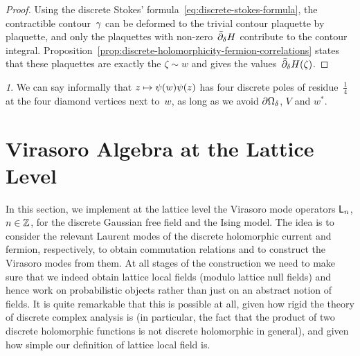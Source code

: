 \documentclass[12pt,oneside,english]{amsart}
\numberwithin{equation}{section}
\numberwithin{figure}{section}
\theoremstyle{plain}
\theoremstyle{plain}
\theoremstyle{plain}
\theoremstyle{plain}
\theoremstyle{remark}
\newtheorem{rem}[thm]{\protect\remarkname}
\theoremstyle{definition}
\theoremstyle{plain}
\theoremstyle{plain}
\numberwithin{thm}{section}
\providecommand{\remarkname}{Remark}
\providecommand{\remarkname}{Remark}
\providecommand{\remarkname}{Remark}
\providecommand{\remarkname}{Remark}
\begin{document}
\begin{proof}
Using the discrete Stokes' formula~\eqref{eq:discrete-stokes-formula},
the contractible contour~$\gamma$ can 
be deformed to the trivial contour plaquette by plaquette, and only the 
plaquettes with non-zero~${{\bar{\partial}}}_{{\delta}} H$ contribute to the contour integral.
Proposition~\ref{prop:discrete-holomorphicity-fermion-correlations}
states that these plaquettes are exactly the $\zeta\sim w$ and gives the 
values~${{\bar{\partial}}}_{{\delta}} H(\zeta)$.
\end{proof}
\begin{rem}
We can say informally that 
$z \mapsto {\psi}(w)  {\psi}(z) $
has four discrete poles of residue~$\frac{1}{4}$ at the four 
diamond vertices next to~$w$, as long as we avoid $\partial{{\Omega}}_{{\delta}} $, $V$ and
$w^{*}$. 
\end{rem}


\section{\label{sec:virasoro-algebra-at-lattice-level}Virasoro Algebra at
the Lattice Level}

In this section, we implement at the lattice level the
Virasoro mode operators $\mathsf{L}_{n}$, $n \in \mathbb{Z}$,
for the discrete Gaussian free field and the Ising model.
The idea is to consider the relevant Laurent modes of the discrete 
holomorphic current and fermion, respectively, to obtain commutation relations
and to construct the Virasoro modes from them.
At all stages of the construction we need to make sure that
we indeed obtain lattice local fields (modulo lattice null fields)
and hence work on probabilistic objects rather than just on an abstract
notion of fields.
It is quite remarkable
that this is possible at all, given how rigid the theory of discrete
complex analysis is (in particular, the fact that the product of two
discrete holomorphic functions is not discrete holomorphic in general),
and given how simple our definition of lattice local field is.
\end{document}

